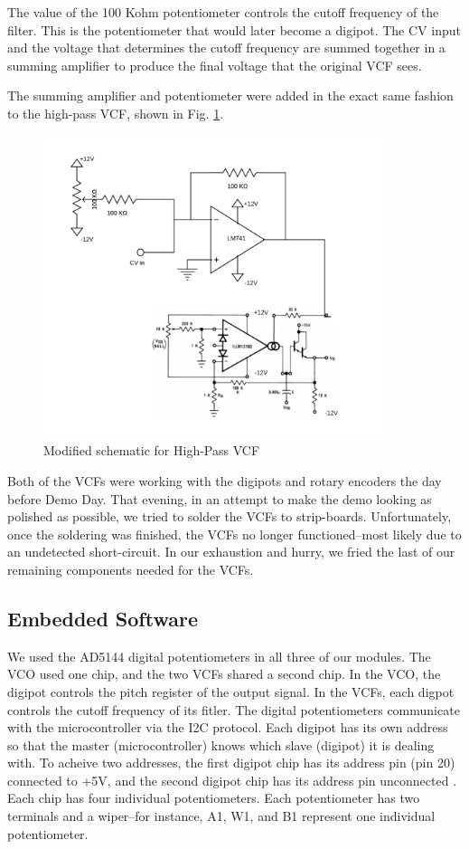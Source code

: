 \documentclass[letterpaper, 12 pt, conference]{ieeeconf}
\begin{document}
\begin{enumerate}
    The value of the 100 Kohm potentiometer controls the cutoff frequency of the filter. This is the potentiometer that would later become a digipot. The CV input and the voltage that determines the cutoff frequency are summed together in a summing amplifier to produce the final voltage that the original VCF sees. 
    
    The summing amplifier and potentiometer were added in the exact same fashion to the high-pass VCF, shown in Fig. \ref{modhpffig}.
    
    \begin{figure}[ht]
    \includegraphics[width=10cm]{modhpf}
    \centering
    \caption{Modified schematic for High-Pass VCF \cite{VCF}}
    \label{modhpffig}
    \end{figure}
    
    Both of the VCFs were working with the digipots and rotary encoders the day before Demo Day. That evening, in an attempt to make the demo looking as polished as possible, we tried to solder the VCFs to strip-boards. Unfortunately, once the soldering was finished, the VCFs no longer functioned--most likely due to an undetected short-circuit. In our exhaustion and hurry, we fried the last of our remaining components needed for the VCFs.
    
\end{enumerate}


\subsection{Embedded Software}

We used the AD5144 digital potentiometers in all three of our modules. The VCO used one chip, and the two VCFs shared a second chip. In the VCO, the digipot controls the pitch register of the output signal. In the VCFs, each digpot controls the cutoff frequency of its fitler. The digital potentiometers communicate with the microcontroller via the I2C protocol. Each digipot has its own address so that the master (microcontroller) knows which slave (digipot) it is dealing with. To acheive two addresses, the first digipot chip has its address pin (pin 20) connected to +5V, and the second digipot chip has its address pin unconnected \cite{pot}. Each chip has four individual potentiometers. Each potentiometer has two terminals and a wiper--for instance, A1, W1, and B1 represent one individual potentiometer.
\end{document}
